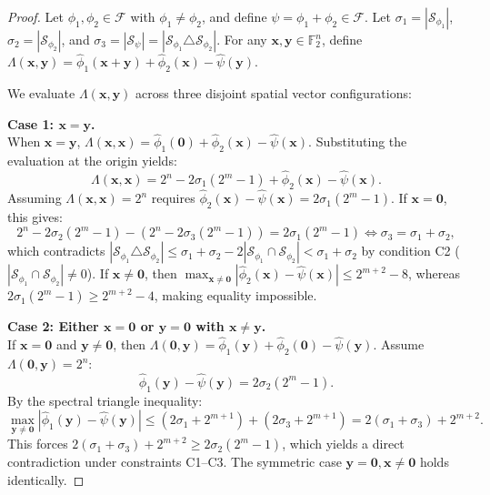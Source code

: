 \documentclass[10pt,a4paper]{amsart}
\begin{document}
\begin{proof}
Let $\phi_1, \phi_2 \in \mathcal{F}$ with $\phi_1 \neq \phi_2$, and define $\psi = \phi_1 + \phi_2 \in \mathcal{F}$. Let $\sigma_1 = |\mathcal{S}_{\phi_1}|$, $\sigma_2 = |\mathcal{S}_{\phi_2}|$, and $\sigma_3 = |\mathcal{S}_{\psi}| = |\mathcal{S}_{\phi_1} \triangle \mathcal{S}_{\phi_2}|$. For any $\mathbf{x}, \mathbf{y} \in \mathbb{F}_2^n$, define $\Lambda(\mathbf{x}, \mathbf{y}) = \widehat{\phi}_1(\mathbf{x}+\mathbf{y}) + \widehat{\phi}_2(\mathbf{x}) - \widehat{\psi}(\mathbf{y})$.


We evaluate $\Lambda(\mathbf{x}, \mathbf{y})$ across three disjoint spatial vector configurations:

\textbf{Case 1: $\mathbf{x} = \mathbf{y}$.} \\
When $\mathbf{x} = \mathbf{y}$,  $\Lambda(\mathbf{x}, \mathbf{x}) = \widehat{\phi}_1(\mathbf{0}) + \widehat{\phi}_2(\mathbf{x}) - \widehat{\psi}(\mathbf{x})$. Substituting the evaluation at the origin yields:
\[
\Lambda(\mathbf{x}, \mathbf{x}) = 2^n - 2\sigma_1(2^m - 1) + \widehat{\phi}_2(\mathbf{x}) - \widehat{\psi}(\mathbf{x}).
\]
Assuming $\Lambda(\mathbf{x}, \mathbf{x}) = 2^n$ requires $\widehat{\phi}_2(\mathbf{x}) - \widehat{\psi}(\mathbf{x}) = 2\sigma_1(2^m - 1)$. If $\mathbf{x} = \mathbf{0}$, this gives:
\[
2^n - 2\sigma_2(2^m - 1) - \left(2^n - 2\sigma_3(2^m - 1)\right) = 2\sigma_1(2^m - 1) \iff \sigma_3 = \sigma_1 + \sigma_2,
\]
which contradicts $|\mathcal{S}_{\phi_1} \triangle \mathcal{S}_{\phi_2}| \leq \sigma_1 + \sigma_2 - 2|\mathcal{S}_{\phi_1} \cap \mathcal{S}_{\phi_2}| < \sigma_1 + \sigma_2$ by condition C2 ($|\mathcal{S}_{\phi_1} \cap \mathcal{S}_{\phi_2}| \neq 0$). If $\mathbf{x} \neq \mathbf{0}$, then $\max_{\mathbf{x} \neq \mathbf{0}} |\widehat{\phi}_2(\mathbf{x}) - \widehat{\psi}(\mathbf{x})| \leq 2^{m+2} - 8$, whereas $2\sigma_1(2^m - 1) \geq 2^{m+2} - 4$, making equality impossible.

\textbf{Case 2: Either $\mathbf{x} = \mathbf{0}$ or $\mathbf{y} = \mathbf{0}$ with $\mathbf{x} \neq \mathbf{y}$.} \\
If $\mathbf{x} = \mathbf{0}$ and $\mathbf{y} \neq \mathbf{0}$, then $\Lambda(\mathbf{0}, \mathbf{y}) = \widehat{\phi}_1(\mathbf{y}) + \widehat{\phi}_2(\mathbf{0}) - \widehat{\psi}(\mathbf{y})$. Assume $\Lambda(\mathbf{0}, \mathbf{y}) = 2^n$:
\[
\widehat{\phi}_1(\mathbf{y}) - \widehat{\psi}(\mathbf{y}) = 2\sigma_2(2^m - 1).
\]
By the spectral triangle inequality:
\[
\max_{\mathbf{y} \neq \mathbf{0}} |\widehat{\phi}_1(\mathbf{y}) - \widehat{\psi}(\mathbf{y})| \leq (2\sigma_1 + 2^{m+1}) + (2\sigma_3 + 2^{m+1}) = 2(\sigma_1 + \sigma_3) + 2^{m+2}.
\]
This forces $2(\sigma_1 + \sigma_3) + 2^{m+2} \geq 2\sigma_2(2^m - 1)$, which yields a direct contradiction under constraints C1–C3. The symmetric case $\mathbf{y} = \mathbf{0}, \mathbf{x} \neq \mathbf{0}$ holds identically.


\end{proof}
\end{document}
